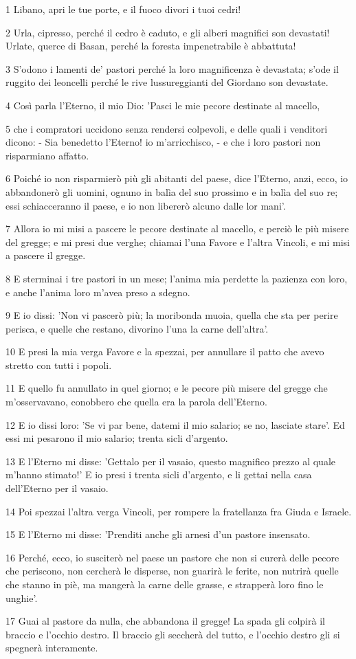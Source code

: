 \par 1 Libano, apri le tue porte, e il fuoco divori i tuoi cedri!
\par 2 Urla, cipresso, perché il cedro è caduto, e gli alberi magnifici son devastati! Urlate, querce di Basan, perché la foresta impenetrabile è abbattuta!
\par 3 S'odono i lamenti de' pastori perché la loro magnificenza è devastata; s'ode il ruggito dei leoncelli perché le rive lussureggianti del Giordano son devastate.
\par 4 Così parla l'Eterno, il mio Dio: 'Pasci le mie pecore destinate al macello,
\par 5 che i compratori uccidono senza rendersi colpevoli, e delle quali i venditori dicono: - Sia benedetto l'Eterno! io m'arricchisco, - e che i loro pastori non risparmiano affatto.
\par 6 Poiché io non risparmierò più gli abitanti del paese, dice l'Eterno, anzi, ecco, io abbandonerò gli uomini, ognuno in balìa del suo prossimo e in balìa del suo re; essi schiacceranno il paese, e io non libererò alcuno dalle lor mani'.
\par 7 Allora io mi misi a pascere le pecore destinate al macello, e perciò le più misere del gregge; e mi presi due verghe; chiamai l'una Favore e l'altra Vincoli, e mi misi a pascere il gregge.
\par 8 E sterminai i tre pastori in un mese; l'anima mia perdette la pazienza con loro, e anche l'anima loro m'avea preso a sdegno.
\par 9 E io dissi: 'Non vi pascerò più; la moribonda muoia, quella che sta per perire perisca, e quelle che restano, divorino l'una la carne dell'altra'.
\par 10 E presi la mia verga Favore e la spezzai, per annullare il patto che avevo stretto con tutti i popoli.
\par 11 E quello fu annullato in quel giorno; e le pecore più misere del gregge che m'osservavano, conobbero che quella era la parola dell'Eterno.
\par 12 E io dissi loro: 'Se vi par bene, datemi il mio salario; se no, lasciate stare'. Ed essi mi pesarono il mio salario; trenta sicli d'argento.
\par 13 E l'Eterno mi disse: 'Gettalo per il vasaio, questo magnifico prezzo al quale m'hanno stimato!' E io presi i trenta sicli d'argento, e li gettai nella casa dell'Eterno per il vasaio.
\par 14 Poi spezzai l'altra verga Vincoli, per rompere la fratellanza fra Giuda e Israele.
\par 15 E l'Eterno mi disse: 'Prenditi anche gli arnesi d'un pastore insensato.
\par 16 Perché, ecco, io susciterò nel paese un pastore che non si curerà delle pecore che periscono, non cercherà le disperse, non guarirà le ferite, non nutrirà quelle che stanno in piè, ma mangerà la carne delle grasse, e strapperà loro fino le unghie'.
\par 17 Guai al pastore da nulla, che abbandona il gregge! La spada gli colpirà il braccio e l'occhio destro. Il braccio gli seccherà del tutto, e l'occhio destro gli si spegnerà interamente.

